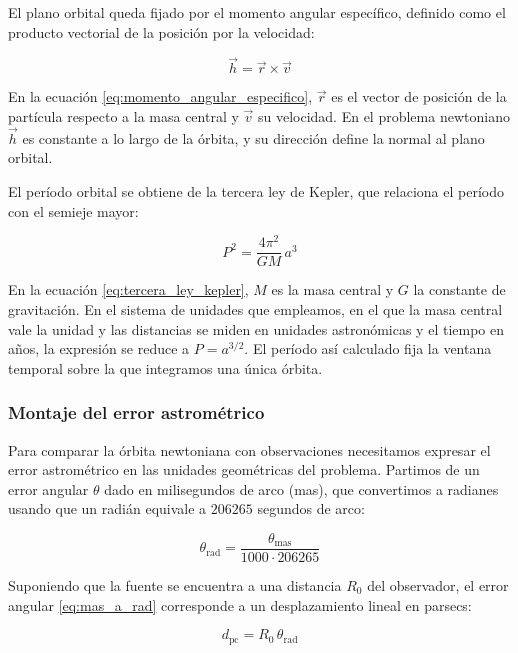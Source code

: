 El plano orbital queda fijado por el momento angular específico, definido como el producto vectorial de la posición por la velocidad:

\begin{equation}
    \vec{h} = \vec{r} \times \vec{v} \label{eq:momento_angular_especifico}
\end{equation}

En la ecuación \eqref{eq:momento_angular_especifico}, $\vec{r}$ es el vector de posición de la partícula respecto a la masa central y $\vec{v}$ su velocidad. En el problema newtoniano $\vec{h}$ es constante a lo largo de la órbita, y su dirección define la normal al plano orbital.

El período orbital se obtiene de la tercera ley de Kepler, que relaciona el período con el semieje mayor:

\begin{equation}
    P^2 = \frac{4\pi^2}{G M}\, a^3 \label{eq:tercera_ley_kepler}
\end{equation}

En la ecuación \eqref{eq:tercera_ley_kepler}, $M$ es la masa central y $G$ la constante de gravitación. En el sistema de unidades que empleamos, en el que la masa central vale la unidad y las distancias se miden en unidades astronómicas y el tiempo en años, la expresión se reduce a $P = a^{3/2}$. El período así calculado fija la ventana temporal sobre la que integramos una única órbita.

\subsubsection{Montaje del error astrométrico}

Para comparar la órbita newtoniana con observaciones necesitamos expresar el error astrométrico en las unidades geométricas del problema. Partimos de un error angular $\theta$ dado en milisegundos de arco (mas), que convertimos a radianes usando que un radián equivale a $206265$ segundos de arco:

\begin{equation}
    \theta_{\text{rad}} = \frac{\theta_{\text{mas}}}{1000 \cdot 206265} \label{eq:mas_a_rad}
\end{equation}

Suponiendo que la fuente se encuentra a una distancia $R_0$ del observador, el error angular \eqref{eq:mas_a_rad} corresponde a un desplazamiento lineal en parsecs:

\begin{equation}
    d_{\text{pc}} = R_0\, \theta_{\text{rad}} \label{eq:error_lineal_pc}
\end{equation}

